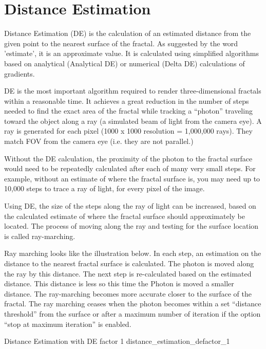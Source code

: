 \section{Distance Estimation}\label{distance-estimation}

Distance Estimation (DE) is the calculation of an estimated distance from the
given point to the nearest surface of the fractal. As suggested by the word
'estimate', it is an approximate value. It is calculated using simplified
algorithms based on analytical (Analytical DE) or numerical (Delta DE)
calculations of gradients.

DE is the most important algorithm required to render three-dimensional fractals
within a reasonable time. It achieves a great reduction in the number of steps
needed to find the exact area of the fractal while tracking a ``photon''
traveling toward the object along a ray (a simulated beam of light from the
camera eye). A ray is generated for each pixel (1000 x 1000 resolution =
1,000,000 rays). They match FOV from the camera eye (i.e. they are not
parallel.)

Without the DE calculation, the proximity of the photon to the fractal surface
would need to be repeatedly calculated after each of many very small steps. For
example, without an estimate of where the fractal surface is, you may need up to
10,000 steps to trace a ray of light, for every pixel of the image.

Using DE, the size of the steps along the ray of light can be increased, based
on the calculated estimate of where the fractal surface should approximately be
located. The process of moving along the ray and testing for the surface
location is called ray-marching.

Ray marching looks like the illustration below. In each step, an estimation on
the distance to the nearest fractal surface is calculated. The photon is moved
along the ray by this distance. The next step is re-calculated based on the
estimated distance. This distance is less so this time the Photon is moved a
smaller distance. The ray-marching becomes more accurate closer to the surface
of the fractal. The ray marching ceases when the photon becomes within a set
``distance threshold'' from the surface or after a maximum number of iteration
if the option ``stop at maximum iteration'' is enabled.

{Distance Estimation with DE factor 1}
{distance_estimation_defactor_1}

